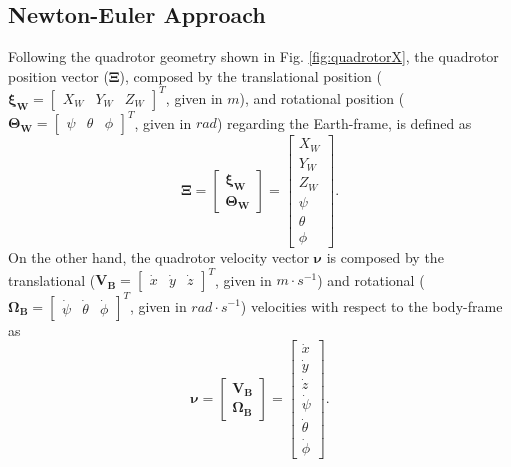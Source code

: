 \subsection{Newton-Euler Approach}
Following the quadrotor geometry shown in Fig. \ref{fig:quadrotorX}, the quadrotor position vector ($\mathbf{\Xi}$), composed by the translational position ($\mathbf{\xi_W} = \begin{bmatrix}
X_W & Y_W & Z_W
\end{bmatrix}^{T} $, given in $m$), and rotational position ($\mathbf{\Theta_W} = \begin{bmatrix}
\psi & \theta & \phi
\end{bmatrix}^{T} $, given in $rad$) regarding the Earth-frame, is defined as
\begin{equation}
\mathbf{\Xi} = \begin{bmatrix}
\mathbf{\xi_W} \\ \mathbf{\Theta_W}
\end{bmatrix} = \begin{bmatrix}
X_W \\ Y_W \\ Z_W \\ \psi \\ \theta \\ \phi
\end{bmatrix}.
\end{equation}
On the other hand, the quadrotor velocity vector $\mathbf{\nu}$ is composed by the translational ($\mathbf{V_B} = \begin{bmatrix}
\dot{x}& \dot{y} & \dot{z}
\end{bmatrix}^{T}$, given in $m\cdot s^{-1}$) and rotational ($\mathbf{\Omega_B} = \begin{bmatrix}
\dot{\psi} & \dot{\theta} & \dot{\phi}
\end{bmatrix}^{T}$, given in $rad\cdot s^{-1}$) velocities with respect to the body-frame as
\begin{equation}
\mathbf{\nu} = \begin{bmatrix}
\mathbf{V_B} \\ \mathbf{\Omega_B}
\end{bmatrix} =
\begin{bmatrix}
\dot{x} \\ \dot{y} \\ \dot{z} \\ \dot{\psi} \\ \dot{\theta} \\ \dot{\phi}
\end{bmatrix}.
\end{equation}
